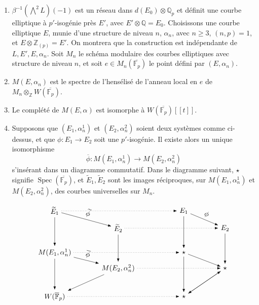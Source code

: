 \documentclass[11pt]{article}
\newcommand{\Q}{\mathbb{Q}}
\newcommand{\Z}{\mathbb{Z}}
\newcommand{\Fp}{\mathbb{F}_{p}}
\newcommand{\Qp}{\mathbb{Q}_{p}}
\newcommand{\Spec}{\operatorname{Spec}}
\newcommand{\wt}{\widetilde}
\begin{document}
\begin{enumerate}[label=(\alph*)]
\item \(\beta^{-1}(\bigwedge^2L)(-1)\) est un réseau dans \(d(E_0)\otimes\Qp\) et définit une courbe elliptique à \(p'\)-isogénie près \(E'\), avec \(E'\otimes\Q=E_0\). Choisissons une courbe elliptique \(E\), munie d'une structure de niveau \(n\), \(\alpha_n\), avec \(n\geq3\), \((n,p)=1\), et \(E\otimes\Z_{(p)}=E'\). On montrera que la construction est indépendante de \(L,E',E,\alpha_n\). Soit \(M_n\) le schéma modulaire des courbes elliptiques avec structure de niveau \(n\), et soit \(e\in M_n(\overline{\Fp})\) le point défini par \((E,\alpha_n)\).
\item \(M(E,\alpha_n)\) est le spectre de l'hensélisé de l'anneau local en \(e\) de \(M_n\otimes_{\Z}W(\overline{\Fp})\).
\item Le complété de \(M(E,\alpha)\) est isomorphe à \(W(\overline{\Fp})[[t]]\).
\item Supposons que \((E_1,\alpha_n^1)\) et \((E_2,\alpha_n^2)\) soient deux systèmes comme ci-dessus, et que \(\phi:E_1\to E_2\) soit une \(p'\)-isogénie. Il existe alors un unique isomorphisme
\[
\overline{\phi}:M(E_1,\alpha_n^1)\longrightarrow M(E_2,\alpha_n^2)
\]
s'insérant dans un diagramme commutatif. Dans le diagramme suivant, \(\star\) signifie \(\Spec(\overline{\Fp})\), et \(\wt E_1,\wt E_2\) sont les images réciproques, sur \(M(E_1,\alpha_n^1)\) et \(M(E_2,\alpha_n^2)\), des courbes universelles sur \(M_n\).

\[
\begin{tikzpicture}[x=1.05cm,y=0.78cm,>=Latex,baseline=(current bounding box.center)]
  \node (Et1) at (0,4.2) {$\widetilde E_1$};
  \node (Et2) at (3.0,3.1) {$\widetilde E_2$};
  \node (M1)  at (0,1.55) {$M(E_1,\alpha_n^1)$};
  \node (M2)  at (3.0,0.55) {$M(E_2,\alpha_n^2)$};
  \node (W)   at (0,-1.25) {$W(\overline{\mathbb F}_p)$};
  \node (E1)  at (6.1,4.2) {$E_1$};
  \node (E2)  at (8.05,3.1) {$E_2$};
  \node (s1)  at (6.1,1.55) {$\star$};
  \node (s2)  at (8.05,0.55) {$\star$};
  \node (s3)  at (6.1,-1.25) {$\star$};
  \draw[->] (Et1) -- node[above,sloped] {$\widetilde\phi$} (Et2);
  \draw[->] (M1) -- node[above,sloped] {$\overline\phi$} (M2);
  \draw[->] (E1) -- node[above,sloped] {$\phi$} (E2);
  \draw[->] (Et1) -- (M1);
  \draw[->] (Et2) -- (M2);
  \draw[->] (M1) -- (W);
  \draw[->] (M2) -- (W);
  \draw[->] (E1) -- (s1);
  \draw[->] (E2) -- (s2);
  \draw[->] (s1) -- (s3);
  \draw[->] (s2) -- (s3);
  \draw[->] (s1) -- (s2);
  \draw[->] (s3) -- (s2);
  \draw[dotted,->] (Et1) -- (E1);
  \draw[dotted,->] (Et2) -- (E2);
  \draw[dotted,->] (M1) -- (s1);
  \draw[dotted,->] (M2) -- (s2);
  \draw[dotted,->] (W) -- (s3);
\end{tikzpicture}
\]

\end{enumerate}
\end{document}

